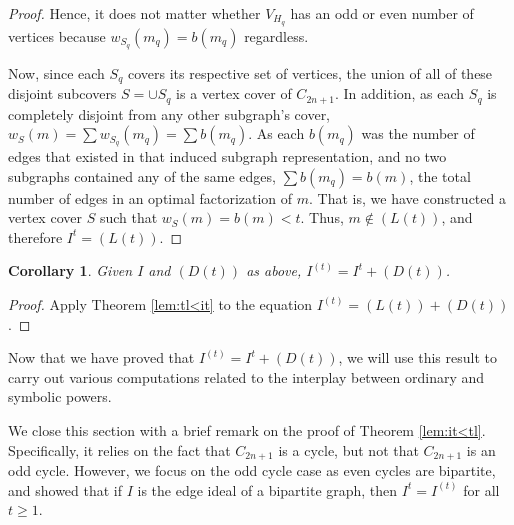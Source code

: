 \documentclass[12pt]{amsart}
\renewcommand{\ge}{\geqslant}
\renewcommand{\le}{\leqslant}
\theoremstyle{plain}
\newtheorem{corollary}[theorem]{Corollary}
\theoremstyle{definition}
\begin{document}
\begin{proof}
Hence, it does not matter whether $V_{H_q}$ has an odd or even number of vertices because $w_{S_q}(m_q) = b(m_q)$ regardless.

Now, since each $S_q$ covers its respective set of vertices, the union of all of these disjoint subcovers $S = \cup S_q$ is a vertex cover of $C_{2n+1}$. In addition, as each $S_q$ is completely disjoint from any other subgraph's cover, $w_{S}(m) = \sum w_{S_q}(m_q) =\sum b(m_q)$. As each $b(m_q)$ was the number of edges that existed in that induced subgraph representation, and no two subgraphs contained any of the same edges, $\sum b(m_q) = b(m)$, the total number of edges in an optimal factorization of $m$. 
That is, we have constructed a vertex cover $S$ such that $w_{S}(m) = b(m) < t$.
Thus, $m\notin (L(t))$, and therefore $I^t = (L(t))$.
%
\end{proof}

\begin{corollary}\label{thm:sorta}
Given $I$ and $(D(t))$ as above, $I^{(t)} = I^t + (D(t))$.
\end{corollary}

\begin{proof}
Apply Theorem \ref{lem:tl<it} to the equation $I^{(t)} = (L(t)) +(D(t))$. %
\end{proof}



Now that we have proved that $I^{(t)} = I^t + (D(t))$, we will use this result to carry out various computations related to the interplay between ordinary and symbolic powers.


We close this section with a brief remark on the proof of Theorem \ref{lem:it<tl}.
Specifically, it relies on the fact that $C_{2n+1}$ is a cycle, but not that $C_{2n+1}$ is an odd cycle.
However, we focus on the odd cycle case as even cycles are bipartite, and \cite{1994:simisvasconcelosvillareal} showed that if $I$ is the edge ideal of a bipartite graph, then $I^t = I^{(t)}$ for all $t \ge 1$.
\end{document}
